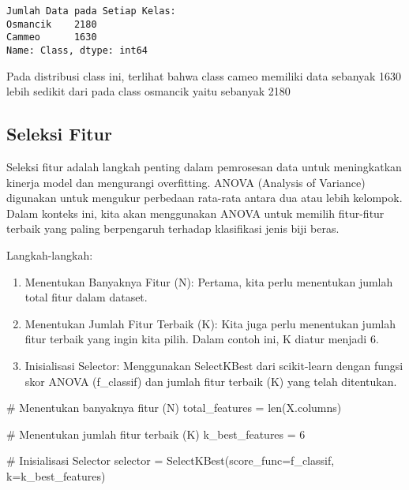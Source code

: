 \documentclass[
  letterpaper,
]{krantz}
\makeatletter
\newenvironment{Shaded}{\begin{snugshade}}{\end{snugshade}}
\newcommand{\BuiltInTok}[1]{\textcolor[rgb]{0.00,0.23,0.31}{#1}}
\newcommand{\CommentTok}[1]{\textcolor[rgb]{0.37,0.37,0.37}{#1}}
\newcommand{\DecValTok}[1]{\textcolor[rgb]{0.68,0.00,0.00}{#1}}
\newcommand{\NormalTok}[1]{\textcolor[rgb]{0.00,0.23,0.31}{#1}}
\newcommand{\OperatorTok}[1]{\textcolor[rgb]{0.37,0.37,0.37}{#1}}
\newenvironment{kframe}{%
\medskip{}
\setlength{\fboxsep}{.8em}
 \def\at@end@of@kframe{}%
 \ifinner\ifhmode%
  \def\at@end@of@kframe{\end{minipage}}%
  \begin{minipage}{\columnwidth}%
 \fi\fi%
 \def\FrameCommand##1{\hskip\@totalleftmargin \hskip-\fboxsep
 \colorbox{shadecolor}{##1}\hskip-\fboxsep
     \hskip-\linewidth \hskip-\@totalleftmargin \hskip\columnwidth}%
 \MakeFramed {\advance\hsize-\width
   \@totalleftmargin\z@ \linewidth\hsize
   \@setminipage}}%
 {\par\unskip\endMakeFramed%
 \at@end@of@kframe}
\renewenvironment{Shaded}{\begin{kframe}}{\end{kframe}}
\makeatother
\begin{document}
\begin{verbatim}
Jumlah Data pada Setiap Kelas:
Osmancik    2180
Cammeo      1630
Name: Class, dtype: int64
\end{verbatim}

Pada distribusi class ini, terlihat bahwa class cameo memiliki data
sebanyak 1630 lebih sedikit dari pada class osmancik yaitu sebanyak 2180

\hypertarget{seleksi-fitur}{%
\subsection{Seleksi Fitur}\label{seleksi-fitur}}

Seleksi fitur adalah langkah penting dalam pemrosesan data untuk
meningkatkan kinerja model dan mengurangi overfitting. ANOVA (Analysis
of Variance) digunakan untuk mengukur perbedaan rata-rata antara dua
atau lebih kelompok. Dalam konteks ini, kita akan menggunakan ANOVA
untuk memilih fitur-fitur terbaik yang paling berpengaruh terhadap
klasifikasi jenis biji beras.

Langkah-langkah:

\begin{enumerate}
\def\labelenumi{\arabic{enumi}.}
\item
  Menentukan Banyaknya Fitur (N): Pertama, kita perlu menentukan jumlah
  total fitur dalam dataset.
\item
  Menentukan Jumlah Fitur Terbaik (K): Kita juga perlu menentukan jumlah
  fitur terbaik yang ingin kita pilih. Dalam contoh ini, K diatur
  menjadi 6.
\item
  Inisialisasi Selector: Menggunakan SelectKBest dari scikit-learn
  dengan fungsi skor ANOVA (f\_classif) dan jumlah fitur terbaik (K)
  yang telah ditentukan.
\end{enumerate}

\begin{Shaded}
\begin{Highlighting}[]


\CommentTok{\# Menentukan banyaknya fitur (N)}
\NormalTok{total\_features }\OperatorTok{=} \BuiltInTok{len}\NormalTok{(X.columns)}

\CommentTok{\# Menentukan jumlah fitur terbaik (K)}
\NormalTok{k\_best\_features }\OperatorTok{=} \DecValTok{6}

\CommentTok{\# Inisialisasi Selector}
\NormalTok{selector }\OperatorTok{=}\NormalTok{ SelectKBest(score\_func}\OperatorTok{=}\NormalTok{f\_classif, k}\OperatorTok{=}\NormalTok{k\_best\_features)}
\end{Highlighting}
\end{Shaded}
\end{document}
